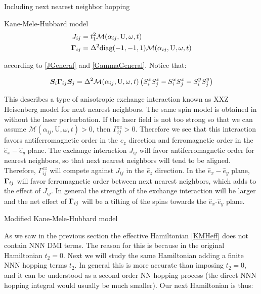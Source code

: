\begin{section}{Including next nearest neighbor hopping}
\begin{subsection}{Kane-Mele-Hubbard model}
\begin{align*}
J_{ij} &= t_1^2\mathcal{M}(\alpha_{ij}, \text{U}, \omega, t) \\
\boldsymbol{\Gamma}_{ij} &= \Delta^2 \text{diag}(-1,-1,1)\mathcal{M}(\alpha_{ij}, \text{U}, \omega, t)
\end{align*}

according to \ref{JGeneral} and \ref{GammaGeneral}. Notice that:

\begin{equation*}
\boldsymbol{S}_i \boldsymbol{\Gamma}_{ij} \boldsymbol{S}_j = \Delta^2 \mathcal{M}(\alpha_{ij}, \text{U}, \omega, t) \left(S_i^zS_j^z - S_i^xS_j^x - S_i^yS_j^y\right)
\end{equation*}

This describes a type of anisotropic exchange interaction known as XXZ Heisenberg model for next nearest neighbors. The same spin model is obtained in \cite{Rachel2010} without the laser perturbation. If the laser field is not too strong so that we can assume $\mathcal{M}(\alpha_{ij}, \text{U}, \omega, t) > 0$, then $\Gamma^{zz}_{ij} > 0$. Therefore we see that this interaction favors antiferromagnetic order in the $\hat{e}_z$ direction and ferromagnetic order in the $\hat{e}_x-\hat{e}_y$ plane. The exchange interaction $J_{ij}$ will favor antiferromagnetic order for nearest neighbors, so that next nearest neighbors will tend to be aligned. Therefore, $\Gamma^{zz}_{ij}$ will compete against $J_{ij}$ in the $\hat{e}_z$ direction. In the $\hat{e}_x-\hat{e}_y$ plane, $\boldsymbol{\Gamma}_{ij}$ will favor ferromagnetic order between next nearest neighbors, which adds to the effect of $J_{ij}$. In general the strength of the exchange interaction will be larger and the net effect of $\boldsymbol{\Gamma}_{ij}$ will be a tilting of the spins towards the $\hat{e}_x$-$\hat{e}_y$ plane.

\end{subsection}

\begin{subsection}{Modified Kane-Mele-Hubbard model}

As we saw in the previous section the effective Hamiltonian \ref{KMHeff} does not contain NNN DMI terms. The reason for this is because in the original Hamiltonian $t_2 = 0$. Next we will study the same Hamiltonian adding a finite NNN hopping terms $t_2$. In general this is more accurate than imposing $t_2 = 0$, and it can be understood as a second order NN hopping process (the direct NNN hopping integral would usually be much smaller). Our next Hamiltonian is thus:


\end{subsection}
\end{section}

